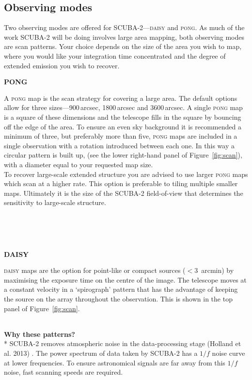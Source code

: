 \documentclass[twoside,11pt]{article}
\newcommand{\htmlref}[2]{#1}
\newcommand{\latex}[1]{#1}
\newcommand{\latexhtml}[2]{#1}
\newcommand{\xlabel}[1]{}
\renewcommand{\_}{\texttt{\symbol{95}}}
\newcommand{\cref}[3]{\latexhtml{#1~\ref{#2}}{\htmlref{#3}{#2}}}
\begin{document}
\subsection{\xlabel{obs_modes}Observing modes}
\label{sec:mmodes}

Two observing modes are offered for SCUBA-2---\textsc{daisy} and
\textsc{pong}. As much of the work \mbox{SCUBA-2} will be doing involves
large area mapping, both observing modes are scan patterns. Your
choice depends on the size of the area you wish to map, where you
would like your integration time concentrated and the degree of
extended emission you wish to recover.

\begin{minipage}[t]{0.15\linewidth}
\textbf{PONG}
\end{minipage}
\begin{minipage}[t]{0.85\linewidth}A \textsc{pong} map is the scan
strategy for covering a large area. The default options allow for three
sizes---900\,arcsec, 1800\,arcsec and 3600\,arcsec. A single \textsc{pong} map is
a square of these dimensions and the telescope fills in the square by
bouncing off the edge of the area. To ensure an even sky background it
is recommended a minimum of three, but preferably more than five,
\textsc{pong} maps are included in a single observation with a
rotation introduced between each one. In this way a circular pattern
is built up, (see the lower right-hand panel of \cref{Figure}{fig:scan}{graphic below}),
with a diameter equal to your requested map size.
\vspace{0.2cm}\\
To recover large-scale extended structure you are advised to use
larger \textsc{pong} maps which scan at a higher rate. This option is
preferable to tiling multiple smaller maps. Ultimately it is the
size of the SCUBA-2 field-of-view that determines the sensitivity to
large-scale structure.
\end{minipage}
\latex{\\ \\ \\}
\begin{minipage}[t]{0.15\linewidth}
\textbf{DAISY}
\end{minipage}
\begin{minipage}[t]{0.85\linewidth}
\textsc{daisy} maps are the option for point-like or compact sources
($<$3~arcmin) by maximising the exposure time on the centre of the
image. The telescope moves at a constant velocity in a `spirograph'
pattern that has the advantage of keeping the source on the array
throughout the observation. This is shown in the top panel of
\cref{Figure}{fig:scan}{the figure below}.
\end{minipage}
\latex{\vspace{1.5cm}}\\
\textbf{Why these patterns?}\\*
SCUBA-2 removes atmospheric noise in the data-processing
stage (Holland et al. 2013) \cite{s2main}. The power spectrum
of data taken by SCUBA-2 has a $1/f$ noise curve at lower frequencies. To
ensure astronomical signals are far away from this $1/f$ noise, fast
scanning speeds are required.
\end{document}
